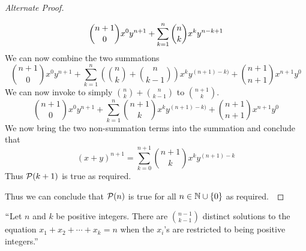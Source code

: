 \begin{proof}[Alternate Proof]
\begin{itemize}
\[                        \dbinom{n + 1}{0} x^0y^{n + 1} + \displaystyle\sum_{k = 1}^{n} \dbinom{n}{k}x^k y^{n - k + 1}
                    \]
                    We can now combine the two summations
                    \[
                        \binom{n + 1}{0} x^0y^{n + 1} +
                        \sum_{k = 1}^{n} \left(\binom{n}{k} + \binom{n}{k - 1}\right) x^{k} y^{(n + 1) - k)} +
                        \binom{n + 1}{n + 1} x^{n + 1}y^0
                    \]
                    We can now invoke  to simply $\binom{n}{k} + \binom{n}{k - 1}$
                    to $\binom{n + 1}{k}$.
                    \[
                        \binom{n + 1}{0} x^0y^{n + 1} +
                        \sum_{k = 1}^{n} \binom{n + 1}{k}x^{k} y^{(n + 1) - k)} +
                        \binom{n + 1}{n + 1} x^{n + 1}y^0
                    \]
                    We now bring the two non-summation terms into the summation and conclude
                    that
                    \[
                        (x + y)^{n + 1} = \sum_{k = 0}^{n + 1} \binom{n + 1}{k} x^k y^{(n + 1) - k}
                    \]
                    Thus $\mathcal{P}(k + 1)$ is true as required.
            \end{itemize}
            Thus we can conclude that $\mathcal{P}(n)$ is true for all $n \in \mathbb{N} \cup \left\{0\right\}$
            as required.~\QED
        \end{proof}
        \begin{theorem}
            $``$Let $n$ and $k$ be positive integers. There are $\binom{n - 1}{k - 1}$ distinct
            solutions to the equation $x_1 + x_2 + \cdots + x_k = n$ when the $x_i$'s are restricted
            to being positive integers.''
            \label{Pirates and Gold 1}
        \end{theorem}
